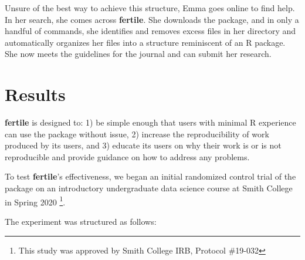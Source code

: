 \documentclass[APA,LATO1COL]{WileyNJD-v2}\usepackage[]{graphicx}\usepackage[]{color}
\newcommand{\R}{\textsf{R}\xspace}
\newcommand{\pkg}[1]{\textbf{#1}}
\begin{document}
Unsure of the best way to achieve this structure, Emma goes online to find help. In her search, she comes across \pkg{fertile}. She downloads the package, and in only a handful of commands, she identifies and removes excess files in her directory and automatically organizes her files into a structure reminiscent of an \R package. She now meets the guidelines for the journal and can submit her research.

\section{Results}

\pkg{fertile} is designed to: 1) be simple enough that users with minimal \R experience can use the package without issue, 2) increase the reproducibility of work produced by its users, and 3) educate its users on why their work is or is not reproducible and provide guidance on how to address any problems.

To test \pkg{fertile}'s effectiveness, we began an initial randomized control trial of the package on an introductory undergraduate data science course at Smith College in Spring 2020 \footnote{This study was approved by Smith College IRB, Protocol \#19-032}.

The experiment was structured as follows:
\end{document}
